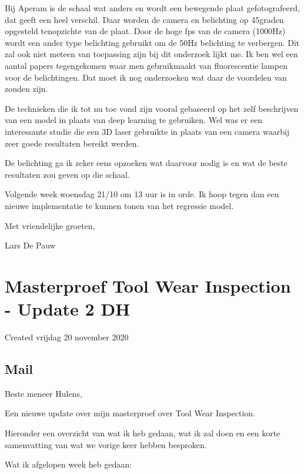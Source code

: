\documentclass{article}
\begin{document}
Bij Aperam is de schaal wat anders en wordt een bewegende plaat gefotografeerd, dat geeft een heel verschil. Daar worden de camera en belichting op 45graden opgesteld tenopzichte van de plaat. Door de hoge fps van de camera (1000Hz) wordt een ander type belichting gebruikt om de 50Hz belichting te verbergen. Dit zal ook niet meteen van toepassing zijn bij dit onderzoek lijkt me. Ik ben wel een aantal papers tegengekomen waar men gebruikmaakt van fluorescentie lampen voor de belichtingen. Dat moet ik nog onderzoeken wat daar de voordelen van zouden zijn.



De technieken die ik tot nu toe vond zijn vooral gebaseerd op het zelf beschrijven van een model in plaats van deep learning te gebruiken. Wel was er een interessante studie die een 3D laser gebruikte in plaats van een camera waarbij zeer goede resultaten bereikt werden. 

De belichting ga ik zeker eens opzoeken wat daarvoor nodig is en wat de beste resultaten zou geven op die schaal. 



Volgende week woensdag 21/10 om 13 uur is in orde. Ik hoop tegen dan een nieuwe implementatie te kunnen tonen van het regressie model.



Met vriendelijke groeten,



Lars De Pauw


		\section{Masterproef Tool Wear Inspection - Update 2 DH}

Created vrijdag 20 november 2020



\subsection{Mail}

Beste meneer Hulens,

 

Een nieuwe update over mijn masterproef over Tool Wear Inspection.

Hieronder een overzicht van wat ik heb gedaan, wat ik zal doen en een korte samenvatting van wat we vorige keer hebben besproken.

 

Wat ik afgelopen week heb gedaan:
\end{document}
